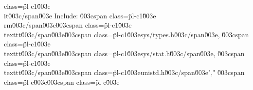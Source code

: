 class=\"pl-c1\"\u003e\\it\u003c/span\u003e Include: \u003cspan class=\"pl-c1\"\u003e\\rm\u003c/span\u003e\u003cspan class=\"pl-c1\"\u003e\\texttt\u003c/span\u003e{\u003cspan class=\"pl-c1\"\u003esys/types.h\u003c/span\u003e}, \u003cspan class=\"pl-c1\"\u003e\\texttt\u003c/span\u003e{\u003cspan class=\"pl-c1\"\u003esys/stat.h\u003c/span\u003e}, \u003cspan class=\"pl-c1\"\u003e\\texttt\u003c/span\u003e{\u003cspan class=\"pl-c1\"\u003eunistd.h\u003c/span\u003e}","        \u003cspan class=\"pl-c\"\u003e\u003cspan class=\"pl-c\"\u003e%